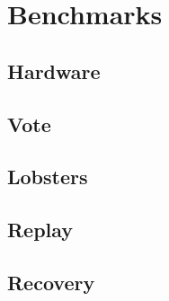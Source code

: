 \chapter{Benchmarks}\label{chap:benchmarks}

\section{Hardware}
\section{Vote}
\section{Lobsters}
\section{Replay}
\section{Recovery}
